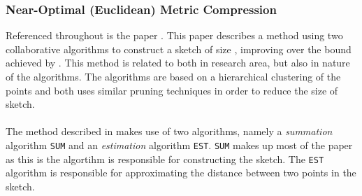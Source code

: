 \subsubsection{Near-Optimal (Euclidean) Metric Compression}
Referenced throughout \cite{wagner17} is the paper \cite{NearO}. This paper describes a method using two collaborative algorithms to construct a sketch of size , improving over the bound achieved by \qs{}. This method is related to \qs{} both in research area, but also in nature of the algorithms. The algorithms are based on a hierarchical clustering of the points and both uses similar pruning techniques in order to reduce the size of sketch.
\\
\\
The method described in \cite{NearO} makes use of two algorithms, namely a \textit{summation} algorithm \texttt{SUM} and an \textit{estimation} algorithm \texttt{EST}. \texttt{SUM} makes up most of the paper as this is the algortihm is responsible for constructing the sketch. The \texttt{EST} algorithm is responsible for approximating the distance between two points in the sketch.

